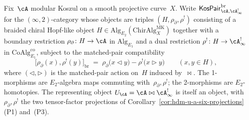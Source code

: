 Fix~$\cA$ modular Koszul on a smooth projective curve~$X$. Write
$\mathsf{KosPair}^{\mathrm{br}}_{\cA,\cA^!_\infty}$ for the
$(\infty,2)$-category whose objects are triples $(H,\rho_\partial,
\rho^!)$ consisting of a braided chiral Hopf-like object
$H\in\mathrm{Alg}_{E_2}(\mathrm{ChirAlg}^{\mathrm{MK}}_X)$ together
with a boundary restriction
$\rho_\partial\colon H\to\cA$ in $\mathrm{Alg}_{E_1}$ and a dual
restriction $\rho^!\colon H\to\cA^!_\infty$ in
$\mathrm{CoAlg}_{E_1}^{\mathrm{co}}$, subject to the matched-pair
compatibility
\begin{equation}\label{eq:hdm-matched-pair}
\bigl[\rho_\partial(x),\rho^!(y)\bigr]_{\mathrm{br}}
\;=\;
\rho_\partial\bigl(x\triangleleft y\bigr)
-\rho^!\bigl(x\triangleright y\bigr)
\qquad (x,y\in H),
\end{equation}
where $(\triangleleft,\triangleright)$ is the matched-pair action
on~$H$ induced by~$\bowtie$. The 1-morphisms are $E_2$-algebra maps
commuting with~$\rho_\partial,\rho^!$; the 2-morphisms are
$E_2$-homotopies. The representing object
$U_\cA=\cA\bowtie\cA^!_\infty$ is itself an object, with
$\rho_\partial,\rho^!$ the two tensor-factor projections of
Corollary~\ref{cor:hdm-u-a-six-projections}(P1) and~(P3).

